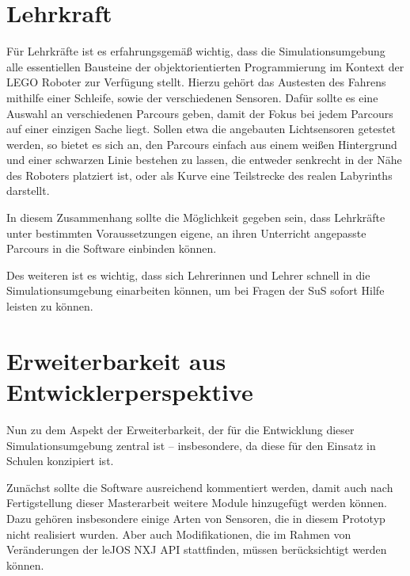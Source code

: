 \documentclass[paper=a4, DIV=calc, BCOR=12mm, twoside=on, onecolumn=on, open = right, titlepage =on, parskip =half-, headsepline = on, footsepline = off, chapterprefix = off, appendixprefix = on, fontsize = 12pt, numbers = noenddot, abstract = on]{scrbook}
\begin{document}
\vspace*{-2ex}
\par \singlespacing
\section{Lehrkraft}
\label{sec:lehrkraft}
\vspace*{-1ex}
\par \onehalfspacing
Für Lehrkräfte ist es erfahrungsgemäß wichtig, dass die Simulationsumgebung alle essentiellen Bausteine der objektorientierten Programmierung im Kontext der \textsc{LEGO} Roboter zur Verfügung stellt. Hierzu gehört das Austesten des Fahrens mithilfe einer Schleife, sowie der verschiedenen Sensoren. Dafür sollte es eine Auswahl an verschiedenen Parcours geben, damit der Fokus bei jedem Parcours auf einer einzigen Sache liegt. Sollen etwa die angebauten Lichtsensoren getestet werden, so bietet es sich an, den Parcours einfach aus einem weißen Hintergrund und einer schwarzen Linie bestehen zu lassen, die entweder senkrecht in der Nähe des Roboters platziert ist, oder als Kurve eine Teilstrecke des realen Labyrinths darstellt.

In diesem Zusammenhang sollte die Möglichkeit gegeben sein, dass Lehrkräfte unter bestimmten Voraussetzungen eigene, an ihren Unterricht angepasste Parcours in die Software einbinden können.

Des weiteren ist es wichtig, dass sich Lehrerinnen und Lehrer schnell in die Simulationsumgebung einarbeiten können, um bei Fragen der SuS sofort Hilfe leisten zu können. 

\par \singlespacing
\section{Erweiterbarkeit aus Entwicklerperspektive} 
\label{sec:erweiterbarkeit}
\onehalfspacing
Nun zu dem Aspekt der Erweiterbarkeit, der für die Entwicklung dieser Simulationsumgebung zentral ist -- insbesondere, da diese für den Einsatz in Schulen konzipiert ist.

Zunächst sollte die Software ausreichend kommentiert werden, damit auch nach Fertigstellung dieser Masterarbeit weitere Module hinzugefügt werden können. Dazu gehören insbesondere einige Arten von Sensoren, die in diesem Prototyp nicht realisiert wurden. Aber auch Modifikationen, die im Rahmen von Veränderungen der leJOS NXJ API stattfinden, müssen berücksichtigt werden können.
\end{document}
